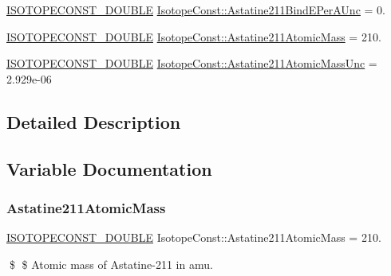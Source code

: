 \begin{DoxyCompactItemize}
\mbox{\hyperlink{group___isotope_const-_macros_ga8f45a7272ce02c0b4c65c44636ed719a}{I\+S\+O\+T\+O\+P\+E\+C\+O\+N\+S\+T\+\_\+\+D\+O\+U\+B\+LE}} \mbox{\hyperlink{group___isotope_const-_astatine-_at211_ga0f9fe344c07c1226fe2818bd75666746}{Isotope\+Const\+::\+Astatine211\+Bind\+E\+Per\+A\+Unc}} = 0.
\item 
\mbox{\hyperlink{group___isotope_const-_macros_ga8f45a7272ce02c0b4c65c44636ed719a}{I\+S\+O\+T\+O\+P\+E\+C\+O\+N\+S\+T\+\_\+\+D\+O\+U\+B\+LE}} \mbox{\hyperlink{group___isotope_const-_astatine-_at211_ga43b46894b1bfcd2684453a4c1168554c}{Isotope\+Const\+::\+Astatine211\+Atomic\+Mass}} = 210.
\item 
\mbox{\hyperlink{group___isotope_const-_macros_ga8f45a7272ce02c0b4c65c44636ed719a}{I\+S\+O\+T\+O\+P\+E\+C\+O\+N\+S\+T\+\_\+\+D\+O\+U\+B\+LE}} \mbox{\hyperlink{group___isotope_const-_astatine-_at211_ga521988c4cbafaccdc97b3a9094765ee4}{Isotope\+Const\+::\+Astatine211\+Atomic\+Mass\+Unc}} = 2.\+929e-\/06
\end{DoxyCompactItemize}


\subsection{Detailed Description}


\subsection{Variable Documentation}
\mbox{\label{group___isotope_const-_astatine-_at211_ga43b46894b1bfcd2684453a4c1168554c}} 
\subsubsection{\texorpdfstring{Astatine211\+Atomic\+Mass}{Astatine211AtomicMass}}
{\footnotesize\ttfamily \mbox{\hyperlink{group___isotope_const-_macros_ga8f45a7272ce02c0b4c65c44636ed719a}{I\+S\+O\+T\+O\+P\+E\+C\+O\+N\+S\+T\+\_\+\+D\+O\+U\+B\+LE}} Isotope\+Const\+::\+Astatine211\+Atomic\+Mass = 210.}

\$ \$ Atomic mass of Astatine-\/211 in amu. \mbox{\label{group___isotope_const-_astatine-_at211_ga521988c4cbafaccdc97b3a9094765ee4}} 
